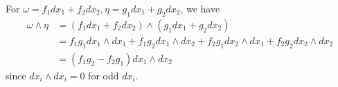 \documentclass[12pt]{article}
\begin{document}
\begin{ex}
    For $\omega = f_1dx_1 + f_2dx_2, \eta = g_1dx_1 + g_2dx_2$, we have
    \begin{align*}
        \omega \wedge \eta &= (f_1dx_1 + f_2dx_2) \wedge (g_1dx_1 + g_2dx_2) \\
                           &= f_1g_1 dx_1 \wedge dx_1 + f_1g_2dx_1 \wedge dx_2 + f_2g_1 dx_2 \wedge dx_1 + f_2g_2 dx_2 \wedge dx_2 \\
                           &= (f_1g_2 - f_2g_1) dx_1 \wedge dx_2
    \end{align*}
    since $dx_i \wedge dx_i = 0$ for odd $dx_i$.
\end{ex}
\end{document}

